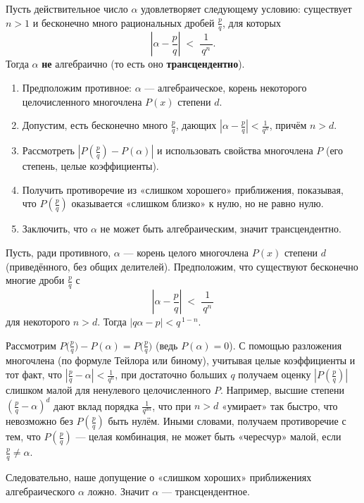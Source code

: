 
\begin{customtheorem}
	Пусть действительное число $\alpha$ удовлетворяет следующему условию:
	существует $n>1$ и бесконечно много рациональных дробей $\tfrac{p}{q}$,
	для которых
	\[
		\left|\alpha - \frac{p}{q}\right|
		\;<\;
		\frac{1}{\,q^n\,}.
	\]
	Тогда $\alpha$ \textbf{не} алгебраично (то есть оно \textbf{трансцендентно}).
\end{customtheorem}

\begin{proofplan}
	\begin{enumerate}
		\item Предположим противное: $\alpha$ — алгебраическое, корень некоторого
		      целочисленного многочлена $P(x)$ степени $d$.
		\item Допустим, есть бесконечно много $\frac{p}{q}$,
		      дающих $|\alpha - \frac{p}{q}| < \frac{1}{q^n}$, причём $n>d$.
		\item Рассмотреть $|P(\tfrac{p}{q}) - P(\alpha)|$ и использовать свойства
		      многочлена $P$ (его степень, целые коэффициенты).
		\item Получить противоречие из «слишком хорошего» приближения, показывая,
		      что $P(\tfrac{p}{q})$ оказывается «слишком близко» к нулю, но не равно нулю.
		\item Заключить, что $\alpha$ не может быть алгебраическим, значит трансцендентно.
	\end{enumerate}
\end{proofplan}

\begin{customproof}
	Пусть, ради противного, $\alpha$ — корень целого многочлена $P(x)$ степени $d$
	(приведённого, без общих делителей).
	Предположим, что существуют бесконечно многие дроби $\tfrac{p}{q}$ с
	\[
		\left|\alpha - \frac{p}{q}\right|
		\;<\;
		\frac{1}{\,q^n\,}
	\]
	для некоторого $n > d$. Тогда $|q\alpha - p| < q^{\,1-n}$.

	Рассмотрим $P\!\bigl(\tfrac{p}{q}\bigr) - P(\alpha)=P\!\bigl(\tfrac{p}{q}\bigr)$ (ведь $P(\alpha)=0$).
	С помощью разложения многочлена (по формуле Тейлора или биному),
	учитывая целые коэффициенты и тот факт, что $|\tfrac{p}{q}-\alpha|<\tfrac{1}{q^n}$,
	при достаточно больших $q$ получаем оценку $|P(\tfrac{p}{q})|$ слишком малой для
	ненулевого целочисленного $P$.
	Например, высшие степени $(\tfrac{p}{q}-\alpha)^d$ дают вклад порядка $\frac{1}{q^{dn}}$, что при $n>d$ «умирает» так быстро, что невозможно без $P(\tfrac{p}{q})$ быть нулём.
	Иными словами, получаем противоречие с тем, что $P(\tfrac{p}{q})$ — целая комбинация,
	не может быть «чересчур» малой, если $\tfrac{p}{q}\neq \alpha$.

	Следовательно, наше допущение о «слишком хороших» приближениях алгебраического $\alpha$ ложно. Значит $\alpha$ — трансцендентное.
\end{customproof}

